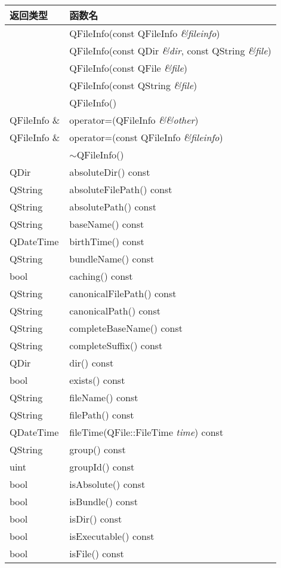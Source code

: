 \begin{longtable}[l]{|l|l|}
\hline
返回类型& 	函数名\\
\hline
&	QFileInfo(const QFileInfo \emph{\&fileinfo})\\
\hline
&	QFileInfo(const QDir \emph{\&dir}, const QString \emph{\&file})\\
\hline
&	QFileInfo(const QFile \emph{\&file})\\
\hline
&	QFileInfo(const QString \emph{\&file})\\
\hline
&	QFileInfo()\\
\hline
QFileInfo \& &	operator=(QFileInfo \emph{\&\&other})\\
\hline
QFileInfo \& &	operator=(const QFileInfo \emph{\&fileinfo})\\
\hline
&	$\sim$QFileInfo()\\
\hline
QDir& 	absoluteDir() const\\
\hline
QString& 	absoluteFilePath() const\\
\hline
QString& 	absolutePath() const\\
\hline
QString& 	baseName() const\\
\hline
QDateTime& 	birthTime() const\\
\hline
QString& 	bundleName() const\\
\hline
bool& 	caching() const\\
\hline
QString& 	canonicalFilePath() const\\
\hline
QString& 	canonicalPath() const\\
\hline
QString& 	completeBaseName() const\\
\hline
QString& 	completeSuffix() const\\
\hline
QDir& 	dir() const\\
\hline
bool& 	exists() const\\
\hline
QString& 	fileName() const\\
\hline
QString& 	filePath() const\\
\hline
QDateTime& 	fileTime(QFile::FileTime \emph{time}) const\\
\hline
QString& 	group() const\\
\hline
uint& 	groupId() const\\
\hline
bool& 	isAbsolute() const\\
\hline
bool& 	isBundle() const\\
\hline
bool& 	isDir() const\\
\hline
bool& 	isExecutable() const\\
\hline
bool& 	isFile() const\\

\end{longtable}
